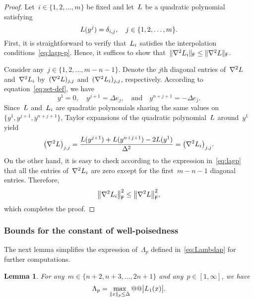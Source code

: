 \documentclass{article}
\numberwithin{equation}{section}
\theoremstyle{definition}
\theoremstyle{plain}
\newtheorem{lemma}{Lemma}[section]
\theoremstyle{remark}
\newcommand*{\abs}[2][]{#1\lvert#2#1\rvert}
\newcommand*{\norm}[2][]{#1\lVert#2#1\rVert}
\newcommand*{\set}[2][]{#1\{#2#1\}}
\newcommand*{\lagp}[1][]{L\ifblank{#1}{}{_{#1}}}
\newcommand{\reviewed}[1]{\texorpdfstring{{\color{NavyBlue}#1}}{#1}}
\begin{document}
\begin{proof}
    Let~$i \in \set{1, 2, \dots, m}$ be fixed and let~$\lagp$ be a quadratic polynomial satisfying
    \begin{equation}
        \label{eq:lagp-p}
        \lagp(y^j) = \delta_{i, j}, \quad j \in \set{1, 2, \dots, m}.
    \end{equation}
    First, it is straightforward to verify that~$\lagp[i]$ satisfies the interpolation conditions~\eqref{eq:lagp-p}.
    Hence, it suffices to show that~$\norm{\nabla^2 \lagp[i]}_\mathsf{F} \le \norm{\nabla^2 \lagp}_\mathsf{F}$.

    Consider any~$j \in \set{1, 2, \dots, m - n - 1}$.
    Denote the $j$th diagonal entries of~$\nabla^2 \lagp$ and~$\nabla^2 \lagp[i]$ by~$(\nabla^2 \lagp)_{j, j}$ and~$(\nabla^2 \lagp[i])_{j, j}$, respectively.
    According to equation~\eqref{eq:set-def}, we have
    \begin{equation*}
        y^1 = 0, \quad y^{j + 1} = \Delta e_j, \quad \text{and} \quad y^{n + j + 1} = -\Delta e_j.
    \end{equation*}
    Since~$\lagp$ and~$\lagp[i]$ are quadratic polynomials sharing the same values on~$\set{y^1, y^{j + 1}, y^{n + j + 1}}$, \reviewed{Taylor expansions of the quadratic polynomial~$\lagp$ around~$y^1$ yield}
    \begin{equation*}
        \big(\nabla^2 \lagp \big)_{j, j} = \frac{\lagp(y^{j + 1}) + \lagp(y^{n + j + 1}) - 2 \lagp(y^1)}{\Delta^2} = \big(\nabla^2 \lagp[i] \big)_{j, j}.
    \end{equation*}
    On the other hand, it is easy to check \reviewed{according to the expression in~\eqref{eq:lagp}} that all the entries of~$\nabla^2 \lagp[i]$ are zero except for the first~$m-n-1$ diagonal entries.
    Therefore,
    \begin{equation*}
        \norm[\big]{\nabla^2 \lagp[i]}_{\mathsf{F}}^2 \le \norm[\big]{\nabla^2 \lagp}_{\mathsf{F}}^2,
    \end{equation*}
    which completes the proof.
\end{proof}

\subsubsection{Bounds for the constant of well-poisedness}

The next lemma simplifies the expression of~$\Lambda_p$ defined in~\eqref{eq:Lambdap} for further computations.

\begin{lemma}
    \label{lem:lambda-p}
    For any~$m \in \set{n + 2, n + 3, \dots, 2n + 1}$ and any~$p \in [1, \infty]$, we have
    \begin{equation}
        \label{eq:lambda-p}
        \Lambda_p = \max_{\norm{x}_p \le \Delta} @@ \abs[\big]{\lagp[1](x)}.
    \end{equation}
\end{lemma}
\end{document}
